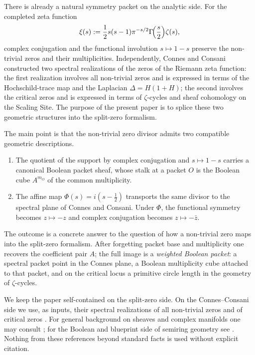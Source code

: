 \documentclass[11pt,a4paper]{article}
\theoremstyle{definition}
\theoremstyle{remark}
\begin{document}
There is already a natural symmetry packet on the analytic side.  For the completed zeta function
\[
\xi(s):=\frac12 s(s-1)\pi^{-s/2}\Gamma\!\Bigl(\frac s2\Bigr)\zeta(s),
\]
complex conjugation and the functional involution $s\mapsto 1-s$ preserve the non-trivial zeros and their multiplicities.  Independently, Connes and Consani constructed two spectral realizations of the zeros of the Riemann zeta function: the first realization involves all non-trivial zeros and is expressed in terms of the Hochschild-trace map and the Laplacian $\Delta=H(1+H)$; the second involves the critical zeros and is expressed in terms of $\zeta$-cycles and sheaf cohomology on the Scaling Site.  The purpose of the present paper is to splice these two geometric structures into the split-zero formalism.

The main point is that the non-trivial zero divisor admits two compatible geometric descriptions.

\begin{enumerate}[label=(\arabic*)]
\item The quotient of the support by complex conjugation and $s\mapsto 1-s$ carries a canonical Boolean packet sheaf, whose stalk at a packet $O$ is the Boolean cube $A^{m_O}$ of the common multiplicity.
\item The affine map $\Phi(s)=i(s-\frac12)$ transports the same divisor to the spectral plane of Connes and Consani.  Under $\Phi$, the functional symmetry becomes $z\mapsto -z$ and complex conjugation becomes $z\mapsto -\bar z$.
\end{enumerate}

The outcome is a concrete answer to the question of how a non-trivial zero maps into the split-zero formalism.  After forgetting packet base and multiplicity one recovers the coefficient pair $A$; the full image is a \emph{weighted Boolean packet}: a spectral packet point in the Connes plane, a Boolean multiplicity cube attached to that packet, and on the critical locus a primitive circle length in the geometry of $\zeta$-cycles.

We keep the paper self-contained on the split-zero side.  On the Connes--Consani side we use, as inputs, their spectral realizations of all non-trivial zeros and of critical zeros \cite{ConnesConsaniCycles}.  For general background on sheaves and complex manifolds one may consult \cite{Lee}; for the Boolean and blueprint side of semiring geometry see \cite{Lorscheid}.  Nothing from these references beyond standard facts is used without explicit citation.
\end{document}
